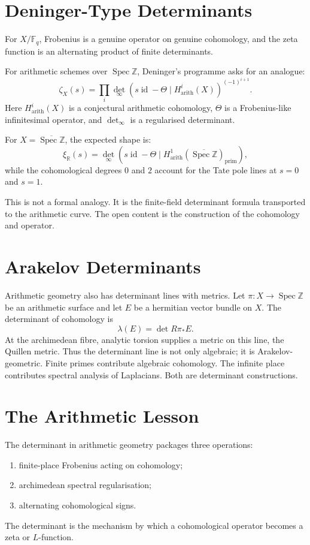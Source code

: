 \documentclass[11pt]{memoir}
\newcommand{\Spec}{\operatorname{Spec}}
\newcommand{\id}{\operatorname{id}}
\newcommand{\bF}{\mathbb{F}}
\newcommand{\bR}{\mathbb{R}}
\newcommand{\bZ}{\mathbb{Z}}
\begin{document}
\section{Deninger-Type Determinants}
\label{sec:deninger}

For \(X/\bF_q\), Frobenius is a genuine operator on genuine
cohomology, and the zeta function is an alternating product of finite
determinants.

For arithmetic schemes over \(\Spec\bZ\), Deninger's programme asks
for an analogue:
\[
  \zeta_X(s)
  =
  \prod_i
  \det_\infty\left(s\id-\Theta\mid H^i_{\mathrm{arith}}(X)\right)^{(-1)^{i+1}}.
\]
Here \(H^i_{\mathrm{arith}}(X)\) is a conjectural arithmetic
cohomology, \(\Theta\) is a Frobenius-like infinitesimal operator, and
\(\det_\infty\) is a regularised determinant.

For \(X=\overline{\Spec\bZ}\), the expected shape is:
\[
  \xi_{\bR}(s)
  =
  \det_\infty\left(s\id-\Theta\mid
  H^1_{\mathrm{arith}}(\overline{\Spec\bZ})_{\mathrm{prim}}\right),
\]
while the cohomological degrees \(0\) and \(2\) account for the Tate
pole lines at \(s=0\) and \(s=1\).

This is not a formal analogy. It is the finite-field determinant
formula transported to the arithmetic curve. The open content is the
construction of the cohomology and operator.

\section{Arakelov Determinants}
\label{sec:arakelov-det}

Arithmetic geometry also has determinant lines with metrics. Let
\(\pi:X\to\Spec\bZ\) be an arithmetic surface and let \(E\) be a
hermitian vector bundle on \(X\). The determinant of cohomology is
\[
  \lambda(E)=\det R\pi_*E.
\]
At the archimedean fibre, analytic torsion supplies a metric on this
line, the Quillen metric. Thus the determinant line is not only
algebraic; it is Arakelov-geometric. Finite primes contribute algebraic
cohomology. The infinite place contributes spectral analysis of
Laplacians. Both are determinant constructions.

\section{The Arithmetic Lesson}
\label{sec:arithmetic-lesson}

The determinant in arithmetic geometry packages three operations:
\begin{enumerate}
\item finite-place Frobenius acting on cohomology;
\item archimedean spectral regularisation;
\item alternating cohomological signs.
\end{enumerate}
The determinant is the mechanism by which a cohomological operator
becomes a zeta or \(L\)-function.
\end{document}
